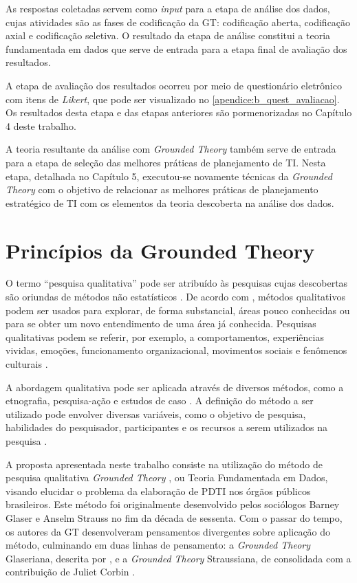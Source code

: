 As respostas coletadas servem como \textit{input} para a etapa de análise dos dados, cujas atividades são as fases de codificação da GT: codificação aberta, codificação axial e codificação seletiva. O resultado da etapa de análise constitui a teoria fundamentada em dados que serve de entrada para a etapa final de avaliação dos resultados.

A etapa de avaliação dos resultados ocorreu por meio de questionário eletrônico com itens de \textit{Likert}, que pode ser visualizado no \autoref{apendice:b_quest_avaliacao}. Os resultados desta etapa e das etapas anteriores são pormenorizadas no Capítulo 4 deste trabalho.

A teoria resultante da análise com \textit{Grounded Theory} também serve de entrada para a etapa de seleção das melhores práticas de planejamento de TI. Nesta etapa, detalhada no Capítulo 5, executou-se novamente técnicas da \textit{Grounded Theory} com o objetivo de relacionar as melhores práticas de planejamento estratégico de TI com os elementos da teoria descoberta na análise dos dados.


\section{Princípios da Grounded Theory}
\label{secao:principios_da_gt}
O termo ``pesquisa qualitativa'' pode ser atribuído às pesquisas cujas descobertas são oriundas de métodos não estatísticos \cite{corbin:98}. De acordo com , métodos qualitativos podem ser usados para explorar, de forma substancial, áreas pouco conhecidas ou para se obter um novo entendimento de uma área já conhecida. Pesquisas qualitativas podem se referir, por exemplo, a comportamentos, experiências vividas, emoções, funcionamento organizacional, movimentos sociais e fenômenos culturais \cite{corbin:98}.

A abordagem qualitativa pode ser aplicada através de diversos métodos, como a etnografia, pesquisa-ação e estudos de caso \cite{patton:90}. A definição do método a ser utilizado pode envolver diversas variáveis, como o objetivo de pesquisa, habilidades do pesquisador, participantes e os recursos a serem utilizados na pesquisa \cite{easterbrook:08}.

A proposta apresentada neste trabalho consiste na utilização do método de pesquisa qualitativa \textit{Grounded Theory}  \cite{glaser:68}, ou Teoria Fundamentada em Dados, visando elucidar o problema da elaboração de PDTI nos órgãos públicos brasileiros. Este método foi originalmente desenvolvido pelos sociólogos Barney Glaser e Anselm Strauss no fim da década de sessenta. Com o passar do tempo, os autores da GT desenvolveram pensamentos divergentes sobre aplicação do método, culminando em duas linhas de pensamento: a \textit{Grounded Theory} Glaseriana, descrita por , e a \textit{Grounded Theory} Straussiana, de  consolidada com a contribuição de Juliet Corbin \cite{corbin:98}.

